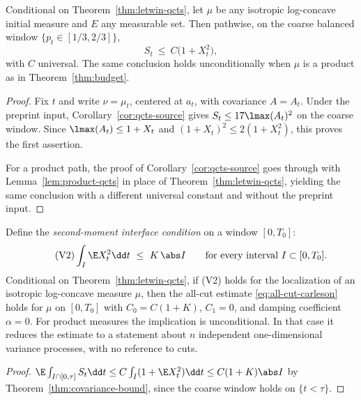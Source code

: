 \documentclass[../../main.tex]{subfiles}
\begin{document}
\begin{theorem}
\label{thm:covariance-bound}
Conditional on Theorem~\ref{thm:letwin-qcts}, let $\mu$ be any isotropic log-concave initial
measure and $E$ any measurable set. Then pathwise, on the coarse balanced window
$\{p_t\in[1/3,2/3]\}$,
\begin{equation}\label{eq:S-le-X2}
  S_t\ \le\ C\bigl(1+X_t^2\bigr),
\end{equation}
with $C$ universal. The same conclusion holds unconditionally when $\mu$ is a product as in
Theorem~\textup{\ref{thm:budget}}.
\end{theorem}

\begin{proof}
Fix $t$ and write $\nu=\mu_t$, centered at $a_t$, with covariance $A=A_t$. Under the preprint
input, Corollary~\ref{cor:qcts-source} gives $S_t\le17\lmax(A_t)^2$ on the coarse window. Since
$\lmax(A_t)\le1+X_t$ and $(1+X_t)^2\le2(1+X_t^2)$, this proves the first assertion.

For a product path, the proof of Corollary~\ref{cor:qcts-source} goes through with
Lemma~\ref{lem:product-qcts} in place of Theorem~\ref{thm:letwin-qcts}, yielding the same
conclusion with a different universal constant and without the preprint input.
\end{proof}

\begin{corollary}
\label{cor:V2-implies}
Define the \emph{second-moment interface condition} on a window $[0,T_0]$:
\begin{equation}\label{eq:V2}
  \tag{V2}
  \int_I\E X_t^2\dd t\ \le\ K\,\abs I
  \qquad\text{for every interval }I\subset[0,T_0].
\end{equation}
Conditional on Theorem~\ref{thm:letwin-qcts}, if \textup{(V2)} holds for the localization of an
isotropic log-concave measure $\mu$, then the all-cut estimate
\eqref{eq:all-cut-carleson} holds for $\mu$ on $[0,T_0]$ with $C_0=C(1+K)$, $C_1=0$, and damping
coefficient $\alpha=0$. For product measures the implication is unconditional. In that case it
reduces the estimate to a statement about $n$ independent one-dimensional variance processes,
with no reference to cuts.
\end{corollary}

\begin{proof}
$\E\int_{I\cap[0,\tau]}S_t\dd t\le C\int_I(1+\E X_t^2)\dd t\le C(1+K)\abs I$ by
Theorem~\ref{thm:covariance-bound}, since the coarse window holds on $\{t<\tau\}$.
\end{proof}
\end{document}
